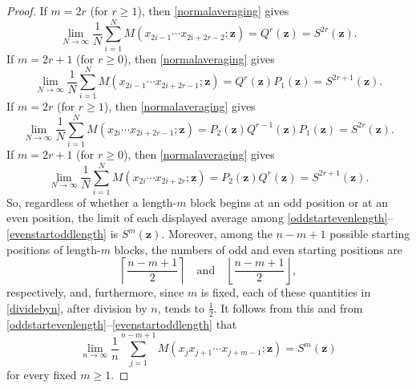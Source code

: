 \documentclass[12pt]{article}
\begin{document}
\begin{proof}
 If $m=2r$ (for $r \geq 1$), then \eqref{normalaveraging} gives 
\begin{equation}\label{oddstartevenlength}
 \lim_{N\to\infty}\frac{1}{N}
 \sum_{i=1}^{N}
 M(x_{2i-1}\cdots x_{2i+2r-2};\mathbf z) 
 = Q^r(\mathbf z) 
 = S^{2r}(\mathbf z).
\end{equation}
 If $m=2r+1$ (for $r \geq 0$), then \eqref{normalaveraging} gives 
\begin{equation}%
 \lim_{N\to\infty}\frac{1}{N}
 \sum_{i=1}^{N}
 M(x_{2i-1}\cdots x_{2i+2r-1};\mathbf z) 
 =Q^r(\mathbf z) P_1(\mathbf z)
 = S^{2r+1}(\mathbf z).
\end{equation}
 If $m=2r$ (for $r \geq 1$), then \eqref{normalaveraging} gives 
\begin{equation}%
 \lim_{N\to\infty}\frac{1}{N}
 \sum_{i=1}^{N}
 M(x_{2i}\cdots x_{2i+2r-1};\mathbf z) 
 = P_2(\mathbf z) Q^{r-1}(\mathbf z) P_1(\mathbf z)
 = S^{2r}(\mathbf z). 
\end{equation} 
 If $m=2r+1$ (for $r \geq 0$), then \eqref{normalaveraging} gives 
\begin{equation}\label{evenstartoddlength}
 \lim_{N\to\infty}\frac{1}{N}
 \sum_{i=1}^{N}
 M(x_{2i}\cdots x_{2i+2r};\mathbf z) 
 = P_2(\mathbf z) Q^r(\mathbf z) 
 = S^{2r+1}(\mathbf z).
\end{equation} 
 So, regardless of whether a length-$m$ block begins at an odd position or at an even position, the limit of each 
 displayed average among \eqref{oddstartevenlength}--\eqref{evenstartoddlength} 
 is $S^m(\mathbf z)$.  Moreover, among 
 the $n-m+1$ possible starting positions of length-$m$ blocks, the numbers of odd and 
 even starting positions are 
\begin{equation}\label{dividebyn} 
 \left\lceil\frac{n-m+1}{2}\right\rceil
 \quad\text{and}\quad
 \left\lfloor\frac{n-m+1}{2}\right\rfloor, 
\end{equation}
 respectively, and, furthermore, since $m$ is fixed, each of these quantities in \eqref{dividebyn}, after division by $n$,
tends to $\frac{1}{2}$. It follows from this and from 
 \eqref{oddstartevenlength}--\eqref{evenstartoddlength} that 
\begin{equation}\label{allstartpositions}
 \lim_{n\to\infty}\frac{1}{n}
 \sum_{j=1}^{n-m+1}M(x_jx_{j+1}\cdots x_{j+m-1};\mathbf z)
 = S^m(\mathbf z) 
\end{equation}
 for every fixed $m\geq1$. 


\end{proof}
\end{document}
